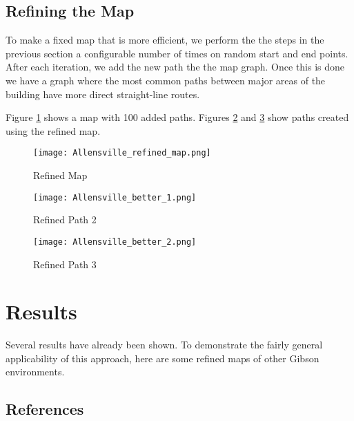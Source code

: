 \documentclass[10pt,twocolumn,letterpaper]{article}
\begin{document}
\subsection{Refining the Map}

To make a fixed map that is more efficient, we perform the the steps
in the previous section a configurable number of times on random start
and end points. After each iteration, we add the new path the the map
graph. Once this is done we have a graph where the most common paths
between major areas of the building have more direct straight-line
routes.

Figure \ref{fig:refined_map} shows a map with 100 added paths. Figures
\ref{fig:path_4} and \ref{fig:path_5} show paths created using the
refined map.

\begin{centering}
\begin{figure}[ht]
\caption{Refined Map} \centering
\texttt{[image: Allensville\_refined\_map.png]}
\label{fig:refined_map}
\end{figure}
\end{centering}

\begin{centering}
\begin{figure}[ht]
\caption{Refined Path 2} \centering
\texttt{[image: Allensville\_better\_1.png]}
\label{fig:path_4}
\end{figure}
\end{centering}

\begin{centering}
\begin{figure}[ht]
\caption{Refined Path 3} \centering
\texttt{[image: Allensville\_better\_2.png]}
\label{fig:path_5}
\end{figure}
\end{centering}

\section{Results}

Several results have already been shown. To demonstrate
the fairly general applicability of this approach, here are
some refined maps of other Gibson environments.

\subsection{References}
\end{document}

